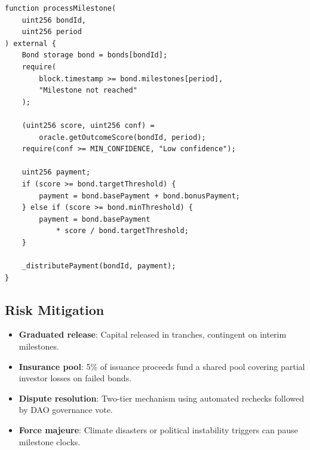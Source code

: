 \begin{lstlisting}[caption={Milestone payment logic.},
  label={lst:payment}]
function processMilestone(
    uint256 bondId,
    uint256 period
) external {
    Bond storage bond = bonds[bondId];
    require(
        block.timestamp >= bond.milestones[period],
        "Milestone not reached"
    );

    (uint256 score, uint256 conf) =
        oracle.getOutcomeScore(bondId, period);
    require(conf >= MIN_CONFIDENCE, "Low confidence");

    uint256 payment;
    if (score >= bond.targetThreshold) {
        payment = bond.basePayment + bond.bonusPayment;
    } else if (score >= bond.minThreshold) {
        payment = bond.basePayment
            * score / bond.targetThreshold;
    }

    _distributePayment(bondId, payment);
}
\end{lstlisting}

\subsection{Risk Mitigation}

\begin{itemize}
  \item \textbf{Graduated release}: Capital released in tranches,
    contingent on interim milestones.
  \item \textbf{Insurance pool}: 5\% of issuance proceeds fund a shared
    pool covering partial investor losses on failed bonds.
  \item \textbf{Dispute resolution}: Two-tier mechanism using automated
    rechecks followed by DAO governance vote.
  \item \textbf{Force majeure}: Climate disasters or political
    instability triggers can pause milestone clocks.
\end{itemize}


